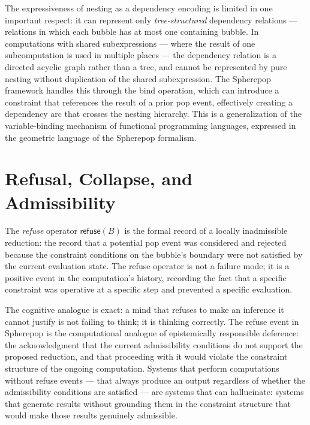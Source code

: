 \documentclass[12pt,openany]{book}
\theoremstyle{plain}
\theoremstyle{definition}
\theoremstyle{remark}
\newcommand{\srefuse}[1]{\mathsf{refuse}\!\left(#1\right)}
\begin{document}
The expressiveness of nesting as a dependency encoding is limited in one important respect: it can represent only \emph{tree-structured} dependency relations — relations in which each bubble has at most one containing bubble. In computations with shared subexpressions — where the result of one subcomputation is used in multiple places — the dependency relation is a directed acyclic graph rather than a tree, and cannot be represented by pure nesting without duplication of the shared subexpression. The Spherepop framework handles this through the bind operation, which can introduce a constraint that references the result of a prior pop event, effectively creating a dependency arc that crosses the nesting hierarchy. This is a generalization of the variable-binding mechanism of functional programming languages, expressed in the geometric language of the Spherepop formalism.

\section{Refusal, Collapse, and Admissibility}

The \emph{refuse} operator $\srefuse{B}$ is the formal record of a locally inadmissible reduction: the record that a potential pop event was considered and rejected because the constraint conditions on the bubble's boundary were not satisfied by the current evaluation state. The refuse operator is not a failure mode; it is a positive event in the computation's history, recording the fact that a specific constraint was operative at a specific step and prevented a specific evaluation.

The cognitive analogue is exact: a mind that refuses to make an inference it cannot justify is not failing to think; it is thinking correctly. The refuse event in Spherepop is the computational analogue of epistemically responsible deference: the acknowledgment that the current admissibility conditions do not support the proposed reduction, and that proceeding with it would violate the constraint structure of the ongoing computation. Systems that perform computations without refuse events — that always produce an output regardless of whether the admissibility conditions are satisfied — are systems that can hallucinate: systems that generate results without grounding them in the constraint structure that would make those results genuinely admissible.
\end{document}
